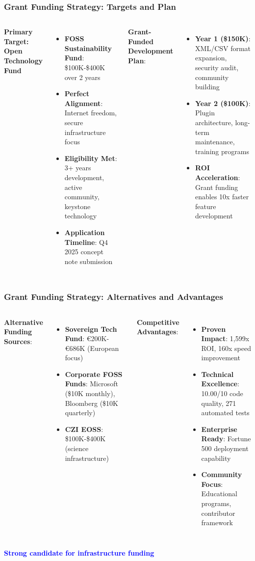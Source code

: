 \begin{frame}
\frametitle{Grant Funding Strategy: Targets and Plan}
\begin{columns}
\textbf{Primary Target: Open Technology Fund}
\begin{itemize}
    \item \textbf{FOSS Sustainability Fund}: \$100K-\$400K over 2 years
    \item \textbf{Perfect Alignment}: Internet freedom, secure infrastructure focus
    \item \textbf{Eligibility Met}: 3+ years development, active community, keystone technology
    \item \textbf{Application Timeline}: Q4 2025 concept note submission
\end{itemize}

\textbf{Grant-Funded Development Plan}:
\begin{itemize}
    \item \textbf{Year 1 (\$150K)}: XML/CSV format expansion, security audit, community building
    \item \textbf{Year 2 (\$100K)}: Plugin architecture, long-term maintenance, training programs
    \item \textbf{ROI Acceleration}: Grant funding enables 10x faster feature development
\end{itemize}
\end{columns}
\end{frame}

\begin{frame}
\frametitle{Grant Funding Strategy: Alternatives and Advantages}
\begin{columns}
\textbf{Alternative Funding Sources}:
\begin{itemize}
    \item \textbf{Sovereign Tech Fund}: €200K-€686K (European focus)
    \item \textbf{Corporate FOSS Funds}: Microsoft (\$10K monthly), Bloomberg (\$10K quarterly)
    \item \textbf{CZI EOSS}: \$100K-\$400K (science infrastructure)
\end{itemize}

\textbf{Competitive Advantages}:
\begin{itemize}
    \item \textbf{Proven Impact}: 1,599x ROI, 160x speed improvement
    \item \textbf{Technical Excellence}: 10.00/10 code quality, 271 automated tests
    \item \textbf{Enterprise Ready}: Fortune 500 deployment capability
    \item \textbf{Community Focus}: Educational programs, contributor framework
\end{itemize}
\end{columns}

\vspace{0.3cm}
\begin{center}
\textcolor{blue}{\textbf{Strong candidate for infrastructure funding}}
\end{center}
\end{frame}